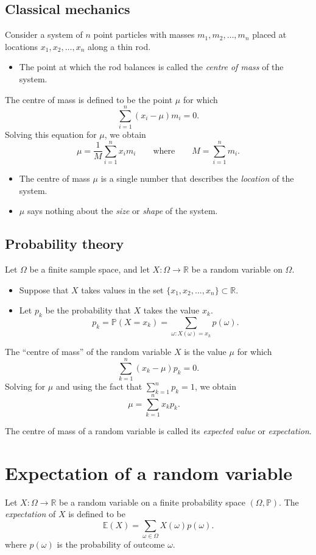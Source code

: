 \documentclass[lecture]{csm}
\newcommand{\R}{\mathbb{R}}
\newcommand{\prob}{\mathbb{P}}
\newcommand{\expe}{\mathbb{E}}
\def\it{\item}
\def\bit{\begin{itemize}}
\def\eit{\end{itemize}}
\begin{document}
\maketitle
\tableofcontents

\subsection*{Classical mechanics}
Consider a system of $n$ point particles with masses $m_1,m_2,\ldots,m_n$ placed at locations $x_1,x_2,\ldots,x_n$ along a thin rod. 
\bit
\it The point at which the rod balances is called the \emph{centre of mass} of the system.
\eit
The centre of mass is defined to be the point $\mu$ for which
\[
\sum_{i=1}^n (x_i-\mu)m_i = 0.
\]
Solving this equation for $\mu$, we obtain
\[
\mu = \frac{1}{M}\sum_{i=1}^n x_im_i\qquad\text{where}\qquad M = \sum_{i=1}^n m_i.
\]

\bit
\it The centre of mass $\mu$ is a single number that describes the \emph{location} of the system.
\it $\mu$ says nothing about the \emph{size} or \emph{shape} of the system.
\eit
	
\break %

\subsection*{Probability theory}
Let $\Omega$ be a finite sample space, and let $X:\Omega\to\R$ be a random variable on $\Omega$.
\bit
\it Suppose that $X$ takes values in the set $\{x_1,x_2,\ldots,x_n\}\subset\R$.
\it Let $p_k$ be the probability that $X$ takes the value $x_k$.
\[
p_k = \prob(X=x_k) = \sum_{\omega:X(\omega)=x_k} p(\omega).
\]
\eit

The ``centre of mass'' of the random variable $X$ is the value $\mu$ for which
\[
\sum_{k=1}^n (x_k-\mu)p_k = 0.
\]
Solving for $\mu$ and using the fact that $\sum_{k=1}^n p_k = 1$, we obtain
\[
\mu = \sum_{k=1}^n x_k p_k.
\quad
\]

The centre of mass of a random variable is called its \emph{expected value} or \emph{expectation}.

\section{Expectation of a random variable}
\begin{definition}
Let $X:\Omega\to\R$ be a random variable on a finite probability space $(\Omega,\prob)$. The \emph{expectation} of $X$ is defined to be
\[
\expe(X) = \sum_{\omega\in\Omega} X(\omega)p(\omega).
\]
where $p(\omega)$ is the probability of outcome $\omega$.
\end{definition}
\end{document}
